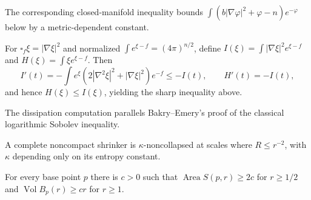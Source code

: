 \begin{remark}
\label{rem:chow-iv-log-sobolev-closed}

The corresponding closed-manifold inequality bounds
$\int(b|\nabla\varphi|^2+\varphi-n)e^{-\varphi}$ below by a metric-dependent constant.
\end{remark}

\begin{lemma}
\label{lem:chow-iv-fisher-entropy-dissipation}


For $\square_f\xi=|\nabla\xi|^2$ and normalized
$\int e^{\xi-f}=(4\pi)^{n/2}$, define
$I(\xi)=\int|\nabla\xi|^2e^{\xi-f}$ and
$H(\xi)=\int\xi e^{\xi-f}$.  Then
\[
I'(t)=-\int e^{\xi}(2|\nabla^2\xi|^2+|\nabla\xi|^2)e^{-f}\le-I(t),
\qquad H'(t)=-I(t),
\]
and hence $H(\xi)\le I(\xi)$, yielding the sharp inequality above.
\end{lemma}

\begin{remark}
\label{rem:chow-iv-bakry-emery-method}

The dissipation computation parallels Bakry--Emery's proof of the classical
logarithmic Sobolev inequality.
\end{remark}

\begin{corollary}
\label{cor:chow-iv-shrinker-noncollapsing}


A complete noncompact shrinker is $\kappa$-noncollapsed at scales where
$R\le r^{-2}$, with $\kappa$ depending only on its entropy constant.
\end{corollary}

\begin{theorem}
\label{thm:chow-iv-shrinker-linear-growth}


For every base point $p$ there is $c>0$ such that
$\operatorname{Area}S(p,r)\ge2c$ for $r\ge1/2$ and
$\operatorname{Vol}B_p(r)\ge cr$ for $r\ge1$.
\end{theorem}


